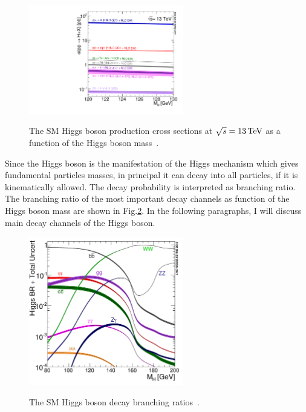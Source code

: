 \begin{figure}[!ht]
  \begin{center}  
    \includegraphics[width=0.6\textwidth]{Fig/plot_13tev_H_sqrt}\\
    \caption{The SM Higgs boson production cross sections at $\sqrt{s}=13\,\text{Te\hspace{-.08em}V}$ as a function of the Higgs boson mass~\cite{LHCHXSWG}.\label{fig:higgsXS}}  
  \end{center}
\end{figure} 

Since the Higgs boson is the manifestation of the Higgs mechanism which gives fundamental particles masses, in principal it can decay into all particles, if it is kinematically allowed. The decay probability is interpreted as branching ratio. The branching ratio of the most important decay channels as function of the Higgs boson mass are shown in Fig.\ref{fig:higgsBR}. In the following paragraphs, I will discuss main decay channels of the Higgs boson. 

\begin{figure}[!ht]
  \begin{center}  
    \includegraphics[width=0.6\textwidth]{Fig/Higgs_BR_LM}\\
    \caption{The SM Higgs boson decay branching ratios~\cite{LHCHXSWG}. \label{fig:higgsBR}}  
  \end{center}
\end{figure} 

